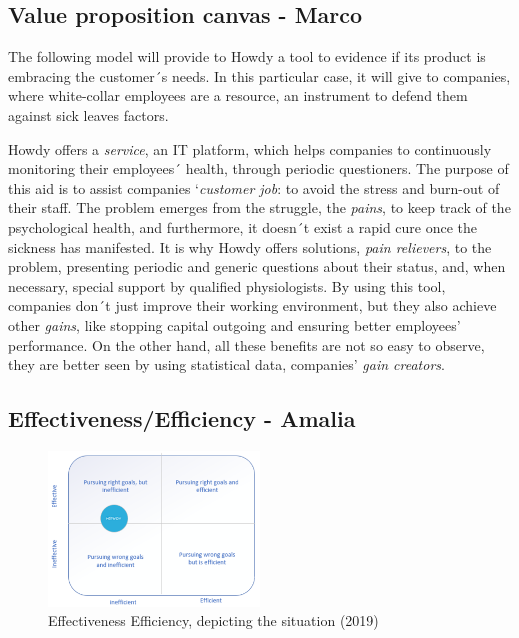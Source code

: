 \subsection{Value proposition canvas - Marco}

The following model will provide to Howdy a tool to evidence if its product is embracing the customer´s needs. In this particular case, it will give to companies, where white-collar employees are a resource, an instrument to defend them against sick leaves factors.

Howdy offers a \textit{service}, an IT platform, which helps companies to continuously monitoring their employees´ health, through periodic questioners. The purpose of this aid is to assist companies ‘\textit{customer job}: to avoid the stress and burn-out of their staff. 
The problem emerges from the struggle, the \textit{pains}, to keep track of the psychological health, and furthermore, it doesn´t exist a rapid cure once the sickness has manifested. It is why Howdy offers solutions, \textit{pain relievers}, to the problem, presenting periodic and generic questions about their status, and, when necessary, special support by qualified physiologists.    
By using this tool, companies don´t just improve their working environment, but they also achieve other \textit{gains}, like stopping capital outgoing and ensuring better employees’ performance. On the other hand, all these benefits are not so easy to observe, they are better seen by using statistical data, companies’ \textit{gain creators}.





\subsection{Effectiveness/Efficiency - Amalia }

\begin{figure}
\centering
\includegraphics[width=0.5\textwidth]{figures/eff.png}
\caption{Effectiveness Efficiency, depicting the situation (2019)}
\label{fig:eff}
\end{figure}

